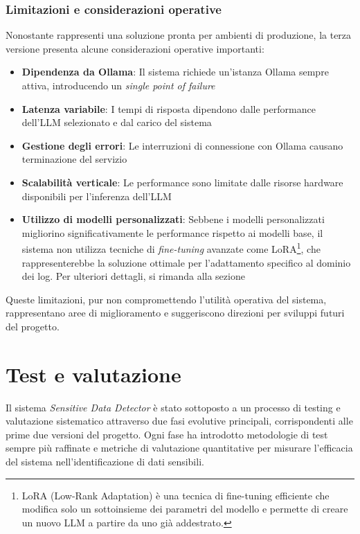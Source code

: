 \documentclass[12pt]{report}
\begin{document}
\subsection{Limitazioni e considerazioni operative}
\label{subsec:ver3_limitazioni}

Nonostante rappresenti una soluzione pronta per ambienti di produzione, la terza versione presenta alcune considerazioni operative importanti:

\begin{itemize}
    \item \textbf{Dipendenza da Ollama}: Il sistema richiede un'istanza Ollama sempre attiva, introducendo un \textit{single point of failure}
    \item \textbf{Latenza variabile}: I tempi di risposta dipendono dalle performance dell'LLM selezionato e dal carico del sistema
    \item \textbf{Gestione degli errori}: Le interruzioni di connessione con Ollama causano terminazione del servizio
    \item \textbf{Scalabilità verticale}: Le performance sono limitate dalle risorse hardware disponibili per l'inferenza dell'LLM
    \item \textbf{Utilizzo di modelli personalizzati}: Sebbene i modelli personalizzati migliorino significativamente le performance rispetto ai modelli base, il sistema non utilizza tecniche di \textit{fine-tuning} avanzate come LoRA\footnote{LoRA (Low-Rank Adaptation) è una tecnica di fine-tuning efficiente che modifica solo un sottoinsieme dei parametri del modello e permette di creare un nuovo LLM a partire da uno già addestrato.}, che rappresenterebbe la soluzione ottimale per l'adattamento specifico al dominio dei log. Per ulteriori dettagli, si rimanda alla sezione 
\end{itemize}

Queste limitazioni, pur non compromettendo l'utilità operativa del sistema, rappresentano aree di miglioramento e suggeriscono direzioni per sviluppi futuri del progetto.



%
%

\chapter{Test e valutazione}
\label{chap:test}

Il sistema \textit{Sensitive Data Detector} è stato sottoposto a un processo di testing e valutazione sistematico attraverso due fasi evolutive principali, corrispondenti alle prime due versioni del progetto. Ogni fase ha introdotto metodologie di test sempre più raffinate e metriche di valutazione quantitative per misurare l'efficacia del sistema nell'identificazione di dati sensibili.
\end{document}
